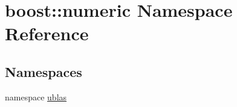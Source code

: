 \hypertarget{namespaceboost_1_1numeric}{\section{boost\-:\-:numeric \-Namespace \-Reference}
\label{namespaceboost_1_1numeric}
}
\subsection*{\-Namespaces}
\begin{DoxyCompactItemize}
\item 
namespace \hyperlink{namespaceboost_1_1numeric_1_1ublas}{ublas}
\end{DoxyCompactItemize}
